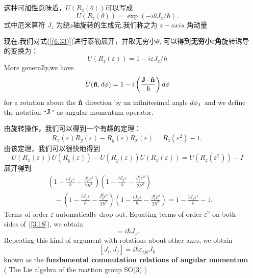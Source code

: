 这种可加性意味着，$U(R_z(\theta))$可以写成
\begin{equation}
	U(R_z(\theta))=\exp\left(-i\theta J_z/\hbar\right). \label{(6.33)}
\end{equation}
式中厄米算符 $J_z$ 为绕$z$轴旋转的生成元,我们称之为 $z-axis$ 角动量\par
现在,我们对式(\ref{(6.33)})进行泰勒展开，并取无穷小$\theta$, 可以得到\textbf{无穷小$\varepsilon$角}旋转诱导的变换为：
\begin{equation}
	U({R_z}(\varepsilon )) = 1 - i\varepsilon {J_z}/\hbar  \label{(6.34)}
\end{equation}
More generally,we have
\begin{equation}
	U({\bf{\hat n}},d\phi ) = 1 - i\left( {\frac{{{\bf{J}} \cdot {\bf{\hat n}}}}{\hbar }} \right)d\phi  \label{(6.35)}
\end{equation}
for a rotation about the ${{\bf{\hat n}}}$ direction by an infinitesimal angle $d\phi $，and we define the notation “${\bf{J}}$” as angular-momentum operator.\par
由旋转操作，我们可以得到一个有趣的定理：
\begin{equation}
	R_{x}(\varepsilon) R_{y}(\varepsilon)-R_{y}(\varepsilon) R_{x}(\varepsilon) =R_{z}(\varepsilon^{2})-1,
\end{equation}
由该定理，我们可以很快地得到
\begin{equation}
	U\left( {{R_x}(\varepsilon )} \right)U\left( {{R_y}(\varepsilon )} \right) - U\left( {{R_y}(\varepsilon )} \right)U\left( {{R_x}(\varepsilon )} \right) = U\left( {{R_z}({\varepsilon ^2})} \right) - I
\end{equation}
展开得到
\begin{equation}
	\begin{aligned}
		&\left(1-\frac{iJ_{x}\varepsilon}{\hbar}-\frac{J_{x}^{2}\varepsilon^{2}}{2\hbar^{2}}\right)
		\left(1-\frac{iJ_{y}\varepsilon}{\hbar}-\frac{J_{y}^{2}\varepsilon^{2}}{2\hbar^{2}}\right) \\
		&\quad -\left(1-\frac{iJ_{y}\varepsilon}{\hbar}-\frac{J_{y}^{2}\varepsilon^{2}}{2\hbar^{2}}\right)
		\left(1-\frac{iJ_{x}\varepsilon}{\hbar}-\frac{J_{x}^{2}\varepsilon^{2}}{2\hbar^{2}}\right)
		= 1-\frac{iJ_{z}\varepsilon^{2}}{\hbar}-1. \label{3.18}
	\end{aligned}
\end{equation}
Terms of order $\varepsilon$ automatically drop out. Equating terms of order $\varepsilon^{2}$ on both sides of (\ref{3.18}), we obtain
\begin{equation}
	[J_{x},J_{y}]=i\hbar J_{z}.
	\label{eq:3.19}
\end{equation}
Repeating this kind of argument with rotations about other axes, we obtain
\begin{equation}
	\boxed{	[J_{i},J_{j}]=i\hbar\varepsilon_{ijk}J_{k}}
	\label{eq:3.20}
\end{equation}
known as the \textbf{fundamental commutation relations of angular momentum} ( The Lie algebra of the roattion group SO(3) )

